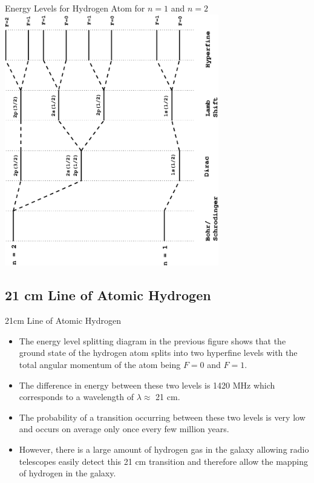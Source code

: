 \documentclass[aspectratio=1610,xcolor=dvipsnames,t]{beamer}
\begin{document}
    \begin{frame}{Energy Levels for Hydrogen Atom for $n=1$ and $n=2$} 
        \centering
        \includegraphics[angle=-90,width=0.7\textwidth]{all.eps}
    \end{frame} 


    \subsection{21 cm Line of Atomic Hydrogen}
    \begin{frame}{21cm Line of Atomic Hydrogen} 
        \begin{itemize} 
            \item The energy level splitting diagram in the previous figure shows that the ground state of
    the hydrogen atom splits into two hyperfine levels with the total angular
    momentum of the atom being $F=0$ and $F=1$.
\item The difference in energy between these two levels is 1420 MHz which corresponds
    to a wavelength of $\lambda \approx $ 21 cm. 
\item The probability of a transition occurring between these two levels is very low and occurs on average only 
    once every few million years. 
\item However, there is a large amount of hydrogen gas
    in the galaxy allowing radio telescopes easily detect this 21 cm transition and
    therefore allow the mapping of hydrogen in the galaxy.
        \end{itemize} 
    \end{frame} 
\end{document}
